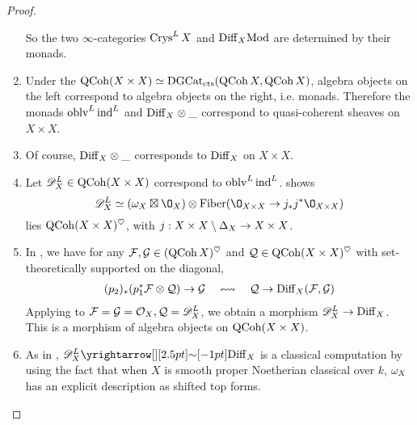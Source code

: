 \documentclass[./main.tex]{subfiles}
\begin{document}
\begin{proof}
\begin{enumerate}
    So the two $\infty$-categories $\mathrm{Crys}^L\,X$ and 
    $\mathrm{Diff}_X\mathrm{Mod}$ are determined by their monads.

    \item Under the 
    $\mathrm{QCoh} (X\times X) \simeq \mathrm{DGCat}_{\mathrm{cts}}(\mathrm{QCoh}\,X , \mathrm{QCoh}\,X)$,
    algebra objects on the left correspond to 
    algebra objects on the right, i.e. monads.
    Therefore the monads $\mathrm{oblv}^L\,\mathrm{ind}^L$ and $\mathrm{Diff}_X \otimes \_$
    correspond to quasi-coherent sheaves on $X \times X$.

    \item Of course, $\mathrm{Diff}_X \otimes \_$ corresponds to 
    $\mathrm{Diff}_X$ on $X \times X$.

    \item
    Let $\mathscr{D}^L_X \in \mathrm{QCoh}(X\times X)$ correspond to $\mathrm{oblv}^L\,\mathrm{ind}^L$.
    \cite[Prop 5.3.6]{Crys} shows 
    \[ 
      \s{D}^L_X \simeq (\om_X \boxtimes \O_X) \otimes 
      \mathrm{Fiber}(\O_{X\times X} \to j_* j^* \O_{X\times X})
    \]
    lies $\mathrm{QCoh}(X\times X)^\heartsuit$,
    with $j : X \times X \setminus \Delta_X \to X \times X$.

    \item
    In \cite[Section 5.4.1]{Crys}, we have
    for any $\mathcal{F}, \mathcal{G} \in (\mathrm{QCoh}\,X)^\heartsuit$ and 
    $\mathcal{Q} \in \mathrm{QCoh}(X \times X)^\heartsuit$ 
    with set-theoretically supported on the diagonal,
    \begin{align*}
      (p_2)_* (p_1^* \mathcal{F} \otimes \mathcal{Q}) \to \mathcal{G} \,\,\,\,\,\,
      \leftrightsquigarrow \,\,\,\,\,\, \mathcal{Q} \to \mathrm{Diff}_X(\mathcal{F} , \mathcal{G})
    \end{align*}
    Applying to $\mathcal{F} = \mathcal{G} = \mathcal{O}_X, \mathcal{Q} = \mathscr{D}^L_X$,
    we obtain a morphism $\mathscr{D}^L_X \to \mathrm{Diff}_X$.
    This is a morphism of algebra objects on $\mathrm{QCoh}(X\times X)$.

    \item 
    As in \cite[Section 5.4.3]{Crys}, 
    $\s{D}^L_X \map{\sim}{} \DIFF_X$ 
    is a classical computation by using the fact that
    when $X$ is smooth proper Noetherian classical over $k$,
    $\omega_X$ has an explicit description as shifted top forms.
    \cite[Lem 48.15.7]{stacks}


\end{enumerate}
\end{proof}
\end{document}
